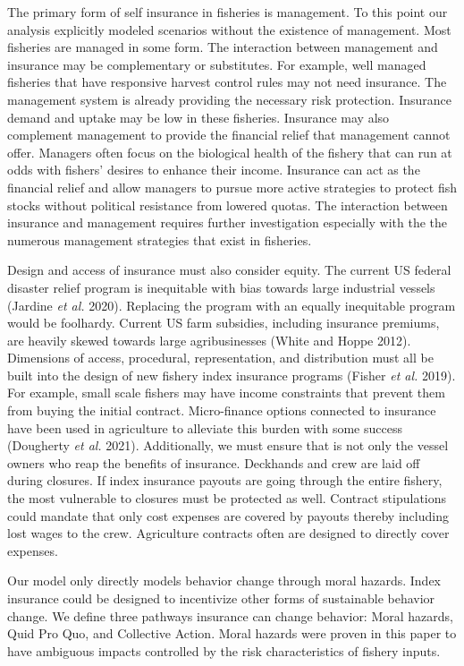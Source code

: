 \documentclass[
  letterpaper,
  DIV=11,
  numbers=noendperiod]{scrartcl}
\theoremstyle{plain}
\theoremstyle{plain}
\theoremstyle{remark}
\begin{document}
The primary form of self insurance in fisheries is management. To this
point our analysis explicitly modeled scenarios without the existence of
management. Most fisheries are managed in some form. The interaction
between management and insurance may be complementary or substitutes.
For example, well managed fisheries that have responsive harvest control
rules may not need insurance. The management system is already providing
the necessary risk protection. Insurance demand and uptake may be low in
these fisheries. Insurance may also complement management to provide the
financial relief that management cannot offer. Managers often focus on
the biological health of the fishery that can run at odds with fishers'
desires to enhance their income. Insurance can act as the financial
relief and allow managers to pursue more active strategies to protect
fish stocks without political resistance from lowered quotas. The
interaction between insurance and management requires further
investigation especially with the the numerous management strategies
that exist in fisheries.

Design and access of insurance must also consider equity. The current US
federal disaster relief program is inequitable with bias towards large
industrial vessels (Jardine \emph{et al.} 2020). Replacing the program
with an equally inequitable program would be foolhardy. Current US farm
subsidies, including insurance premiums, are heavily skewed towards
large agribusinesses (White and Hoppe 2012). Dimensions of access,
procedural, representation, and distribution must all be built into the
design of new fishery index insurance programs (Fisher \emph{et al.}
2019). For example, small scale fishers may have income constraints that
prevent them from buying the initial contract. Micro-finance options
connected to insurance have been used in agriculture to alleviate this
burden with some success (Dougherty \emph{et al.} 2021). Additionally,
we must ensure that is not only the vessel owners who reap the benefits
of insurance. Deckhands and crew are laid off during closures. If index
insurance payouts are going through the entire fishery, the most
vulnerable to closures must be protected as well. Contract stipulations
could mandate that only cost expenses are covered by payouts thereby
including lost wages to the crew. Agriculture contracts often are
designed to directly cover expenses.

Our model only directly models behavior change through moral hazards.
Index insurance could be designed to incentivize other forms of
sustainable behavior change. We define three pathways insurance can
change behavior: Moral hazards, Quid Pro Quo, and Collective Action.
Moral hazards were proven in this paper to have ambiguous impacts
controlled by the risk characteristics of fishery inputs.
\end{document}
